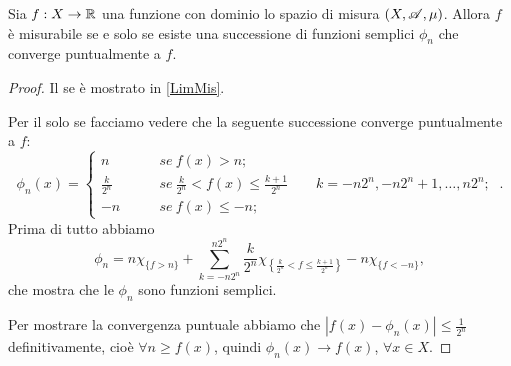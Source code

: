\begin{proposition}
	\label{LimSemMis}
	Sia $f:X \rightarrow \mathbb R$ una funzione con dominio lo spazio di misura $(X,\mathscr A,\mu)$.
	Allora $f$ è misurabile se e solo se esiste una successione di funzioni semplici $\phi_n$ che converge puntualmente a $f$.
\end{proposition}
\begin{proof}
	Il se è mostrato in \cref{LimMis}.
	
	Per il solo se facciamo vedere che la seguente successione converge puntualmente a $f$:
	\[
		\phi_n(x) =
		\left\{ \begin{array}{ll}
			n &\qquad se\ f(x)>n;\\
			\frac{k}{2^n} &\qquad se\ \frac{k}{2^n}<f(x)\leq \frac{k+1}{2^n} \qquad k=-n2^n,-n2^n+1,\dots,n2^n;\\%
			-n &\qquad se\ f(x)\leq-n;
		\end{array} \right.\ .
	\]
	Prima di tutto abbiamo 
	\[\phi_n=
		n\chi_{\{f>n\}}+
		\sum_{k=-n2^n}^{n2^n}\frac{k}{2^n}\chi_{\left\{ \frac{k}{2^n}<f\leq \frac{k+1}{2^n} \right\}}
		-n\chi_{\{f<-n\}},
	\]
	che mostra che le $\phi_n$ sono funzioni semplici.
	
	Per mostrare la convergenza puntuale abbiamo che $|f(x)-\phi_n(x)|\leq \frac{1}{2^n}$ definitivamente, cioè $\forall n\geq f(x)$,
	quindi $\phi_n(x)\rightarrow f(x)$, $\forall x\in X$.
\end{proof}

